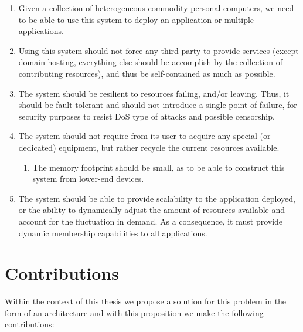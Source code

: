 \documentclass[12pt, titlepage]{uo_temp}
\begin{document}
     \begin{enumerate}[label={\bf Requirement \arabic*},
                       wide=\parindent,
                       leftmargin=\parindent,
                       rightmargin=\parindent] \label{requirements}
     \item Given a collection of heterogeneous commodity personal computers, we need to be
       able to use this system to deploy an application or multiple applications.
     \item Using this system should not force any third-party to provide services (except
       domain hosting, everything else should be accomplish by the collection of
       contributing resources), and thus be self-contained as much as possible.
     \item The system should be resilient to resources failing, and/or leaving. Thus, it
       should be fault-tolerant and should not introduce a single point of failure, for
       security purposes to resist DoS type of attacks and possible censorship.
     \item The system should not require from its user to acquire any special (or
       dedicated) equipment, but rather recycle the current resources available.
     \begin{enumerate}[label={\bf Sub-Requirement \arabic*},
                       wide=\parindent,
                       leftmargin=\parindent,
                       rightmargin=\parindent]
     \item The memory footprint should be small, as to be able to construct this
       system from lower-end devices.
     \end{enumerate}
     \item The system should be able to provide scalability to the application deployed,
       or the ability to dynamically adjust the amount of resources available and account
       for the fluctuation in demand. As a consequence, it must provide dynamic membership
       capabilities to all applications.
     \end{enumerate}


     \section{Contributions}\label{contributions}
     Within the context of this thesis we propose a solution for this problem in the form
     of an architecture and with this proposition we make the following contributions:
\end{document}
